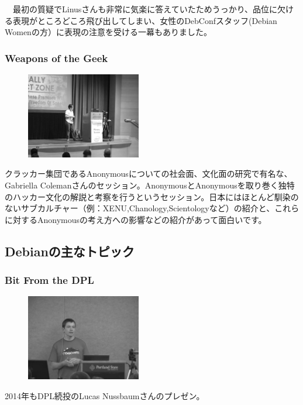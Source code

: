 \documentclass[mingoth,a4paper]{jsarticle}
\begin{document}
　最初の質疑でLinusさんも非常に気楽に答えていたためうっかり、品位に欠ける表現がところどころ飛び出してしまい、女性のDebConfスタッフ(Debian Womenの方）に表現の注意を受ける一幕もありました。

 \subsubsection{Weapons of the Geek}

\begin{figure}
  \includegraphics[width=5cm]{image201409/weapon_geek_mono.png}
\end{figure}

 クラッカー集団であるAnonymousについての社会面、文化面の研究で有名な、Gabriella Colemanさんのセッション。AnonymousとAnonymousを取り巻く独特のハッカー文化の解説と考察を行うというセッション。日本にはほとんど馴染のないサブカルチャー（例：XENU,Chanology,Scientologyなど）の紹介と、これらに対するAnonymousの考え方への影響などの紹介があって面白いです。

\subsection{Debianの主なトピック}

\subsubsection{Bit From the DPL}

\begin{figure}
  \includegraphics[width=5cm]{image201409/bit_dpl_mono.png}
\end{figure}

 2014年もDPL続投のLucas Nussbaumさんのプレゼン。
\end{document}
